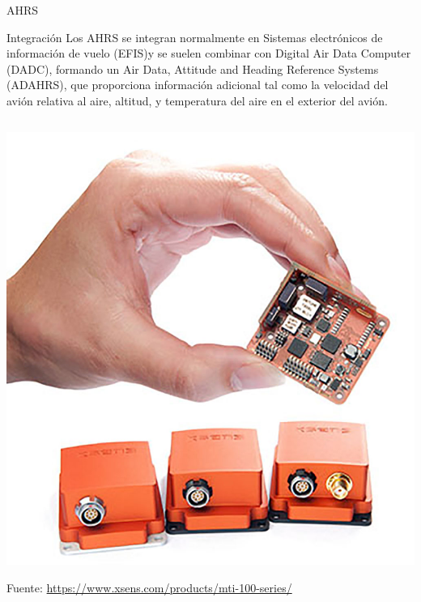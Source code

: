 \begin{frame}{AHRS}

\begin{exampleblock}{Integraci\'on}
  Los AHRS se integran normalmente en Sistemas electrónicos de información de vuelo (EFIS)y se suelen combinar con Digital Air Data Computer (DADC), formando un Air Data, Attitude and Heading Reference Systems (ADAHRS), que proporciona información adicional tal como la velocidad del avión relativa al aire, altitud, y temperatura del aire en el exterior del avión. 
\end{exampleblock}

\begin{columns}
  \begin{column}{0.6\textwidth}
    \includegraphics[height=0.45\textheight]{05.instrumentos.giroscopicos.imagenes/05.06.central.giroscopica/05-06-ahrs_.jpg}

    {\tiny Fuente: \url{https://www.xsens.com/products/mti-100-series/}}


\end{column}
\end{columns}
\end{frame}
